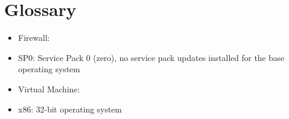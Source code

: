 \section{Glossary}

\begin{itemize}
\item Firewall:
\item SP0: Service Pack 0 (zero), no service pack updates installed for the base operating system
\item Virtual Machine:
\item x86: 32-bit operating system
\end{itemize}